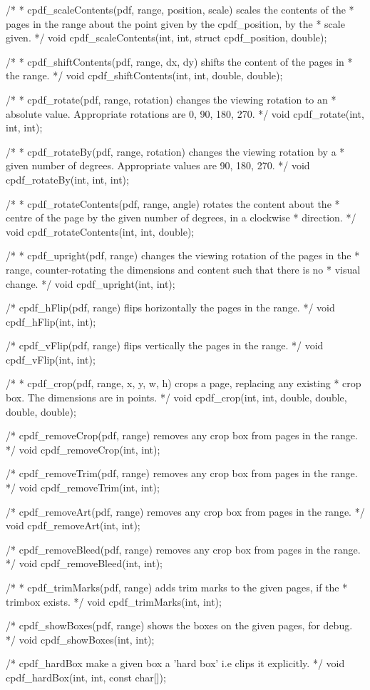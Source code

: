 /*
 * cpdf_scaleContents(pdf, range, position, scale) scales the contents of the
 * pages in the range about the point given by the cpdf_position, by the
 * scale given.
 */
void cpdf_scaleContents(int, int, struct cpdf_position, double);

/*
 * cpdf_shiftContents(pdf, range, dx, dy) shifts the content of the pages in
 * the range.
 */
void cpdf_shiftContents(int, int, double, double);

/*
 * cpdf_rotate(pdf, range, rotation) changes the viewing rotation to an
 * absolute value. Appropriate rotations are 0, 90, 180, 270.
 */
void cpdf_rotate(int, int, int);

/*
 * cpdf_rotateBy(pdf, range, rotation) changes the viewing rotation by a
 * given number of degrees. Appropriate values are 90, 180, 270.
 */
void cpdf_rotateBy(int, int, int);

/*
 * cpdf_rotateContents(pdf, range, angle) rotates the content about the
 * centre of the page by the given number of degrees, in a clockwise
 * direction.
 */
void cpdf_rotateContents(int, int, double);

/*
 * cpdf_upright(pdf, range) changes the viewing rotation of the pages in the
 * range, counter-rotating the dimensions and content such that there is no
 * visual change.
 */
void cpdf_upright(int, int);

/* cpdf_hFlip(pdf, range) flips horizontally the pages in the range. */
void cpdf_hFlip(int, int);

/* cpdf_vFlip(pdf, range) flips vertically the pages in the range. */
void cpdf_vFlip(int, int);

/*
 * cpdf_crop(pdf, range, x, y, w, h) crops a page, replacing any existing
 * crop box. The dimensions are in points.
 */
void cpdf_crop(int, int, double, double, double, double);

/* cpdf_removeCrop(pdf, range) removes any crop box from pages in the range. */
void cpdf_removeCrop(int, int);

/* cpdf_removeTrim(pdf, range) removes any crop box from pages in the range. */
void cpdf_removeTrim(int, int);

/* cpdf_removeArt(pdf, range) removes any crop box from pages in the range. */
void cpdf_removeArt(int, int);

/* cpdf_removeBleed(pdf, range) removes any crop box from pages in the range. */
void cpdf_removeBleed(int, int);

/*
 * cpdf_trimMarks(pdf, range) adds trim marks to the given pages, if the
 * trimbox exists.
 */
void cpdf_trimMarks(int, int);

/* cpdf_showBoxes(pdf, range) shows the boxes on the given pages, for debug. */
void cpdf_showBoxes(int, int);

/* cpdf_hardBox make a given box a 'hard box' i.e clips it explicitly. */
void cpdf_hardBox(int, int, const char[]);

